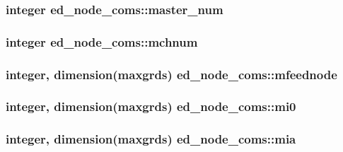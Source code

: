 \subsubsection[{\texorpdfstring{master\+\_\+num}{master_num}}]{\setlength{\rightskip}{0pt plus 5cm}integer ed\+\_\+node\+\_\+coms\+::master\+\_\+num}\hypertarget{namespaceed__node__coms_a07ddd50e92be990673b9c78656aaade5}{}\label{namespaceed__node__coms_a07ddd50e92be990673b9c78656aaade5}
\subsubsection[{\texorpdfstring{mchnum}{mchnum}}]{\setlength{\rightskip}{0pt plus 5cm}integer ed\+\_\+node\+\_\+coms\+::mchnum}\hypertarget{namespaceed__node__coms_a6eaf5989fc4f739cb5003064f0355966}{}\label{namespaceed__node__coms_a6eaf5989fc4f739cb5003064f0355966}
\subsubsection[{\texorpdfstring{mfeednode}{mfeednode}}]{\setlength{\rightskip}{0pt plus 5cm}integer, dimension(maxgrds) ed\+\_\+node\+\_\+coms\+::mfeednode}\hypertarget{namespaceed__node__coms_a5de467657a345cda5f1b8bdd83cb8cb4}{}\label{namespaceed__node__coms_a5de467657a345cda5f1b8bdd83cb8cb4}
\subsubsection[{\texorpdfstring{mi0}{mi0}}]{\setlength{\rightskip}{0pt plus 5cm}integer, dimension(maxgrds) ed\+\_\+node\+\_\+coms\+::mi0}\hypertarget{namespaceed__node__coms_ac0ed536bf855d993b1468e7313b63c56}{}\label{namespaceed__node__coms_ac0ed536bf855d993b1468e7313b63c56}
\subsubsection[{\texorpdfstring{mia}{mia}}]{\setlength{\rightskip}{0pt plus 5cm}integer, dimension(maxgrds) ed\+\_\+node\+\_\+coms\+::mia}\hypertarget{namespaceed__node__coms_aa872e042de37a4d54f239c536576fa3a}{}\label{namespaceed__node__coms_aa872e042de37a4d54f239c536576fa3a}
